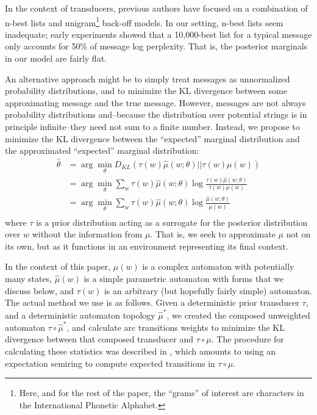 \documentclass[11pt,a4paper]{article}
\begin{document}
In the context of transducers, previous authors have focused on a
combination of n-best lists and unigram\footnote{Here, and for the
rest of the paper, the ``grams'' of interest are characters in the
International Phonetic Alphabet.} back-off models. \cite{dreyer2009graphical}
In our setting, n-best lists seem inadequate; early experiments
showed that a 10,000-best list for a typical message only accounts
for 50\% of message log perplexity. That is, the posterior marginals in
our model are fairly flat.

An alternative approach might be to simply treat messages as
unnormalized probability distributions, and to minimize the KL
divergence between some approximating message and the true message.
However, messages are not always probability distributions and--because
the distribution over potential strings is in principle infinite--they
need not sum to a finite number. Instead, we propose to minimize
the KL divergence between the ``expected'' marginal distribution
and the approximated ``expected'' marginal distribution:
\begin{equation}
  \begin{split}
    \hat\theta &= \arg\!\min_{\theta} D_{KL}(\tau(w)\hat\mu(w;\theta)||\tau(w)\mu(w) ) \\
    &= \arg\!\min_{\theta} \sum_w \tau(w) \hat\mu(w;\theta) \log \frac{\tau(w)\hat\mu(w;\theta)}{\tau(w)\mu(w)} \\
    &= \arg\!\min_{\theta} \sum_w \tau(w) \hat\mu(w;\theta) \log \frac{\hat\mu(w;\theta)}{\mu(w)} \\
   \end{split}
 \end{equation}
where $\tau$ is a prior distribution acting as a surrogate for the posterior
distribution over $w$ without the information from $\mu$. That is, we 
seek to approximate $\mu$ not on its own, but as it functions in
an environment representing its final context. 

In the context of this paper, $\mu(w)$ is a complex automaton with
potentially many states, $\hat\mu(w)$ is a simple parametric automaton
with forms that we discuss below, and $\tau(w)$ is an arbitrary
(but hopefully fairly simple) automaton.  The actual method we use
is as follows. Given a deterministic prior transducer $\tau$, and
a deterministic automaton topology $\hat\mu^*$, we created the
composed unweighted automaton $\tau \circ \hat \mu^*$, and calculate
arc transitions weights to minimize the KL divergence between that
composed transducer and $\tau\circ\mu$.  The procedure for calculating
these statistics was described in , which
amounts to using an expectation semiring \cite{eisner2001expectation}
to compute expected transitions in $\tau\circ\mu$.
\end{document}
